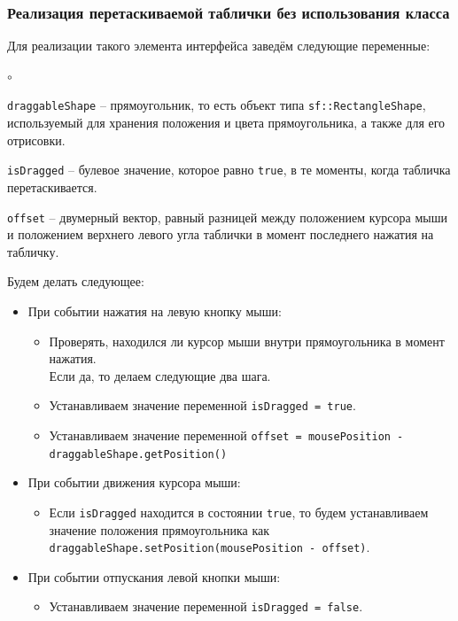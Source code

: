 \documentclass{article}
\begin{document}
\subsubsection*{Реализация перетаскиваемой таблички без использования класса}
 Для реализации такого элемента интерфейса заведём следующие переменные:
\begin{list}{$\circ$}{}  
\item \texttt{draggableShape} -- прямоугольник, то есть объект типа \texttt{sf::RectangleShape}, используемый для хранения положения и цвета прямоугольника, а также для его отрисовки.
\item \texttt{isDragged} -- булевое значение, которое равно \texttt{true}, в те моменты, когда табличка перетаскивается.
\item \texttt{offset} -- двумерный вектор, равный разницей между положением курсора мыши и положением верхнего левого угла таблички в момент последнего нажатия на табличку.
\end{list}
Будем делать следующее:
\begin{itemize}
\item При событии нажатия на левую кнопку мыши:
\begin{itemize}
\item Проверять, находился ли курсор мыши внутри прямоугольника в момент нажатия.\\
Если да, то делаем следующие два шага.
\item Устанавливаем значение переменной \texttt{isDragged = true}.
\item Устанавливаем значение переменной \texttt{offset = mousePosition - draggableShape.getPosition()}
\end{itemize}

\item При событии движения курсора мыши:
\begin{itemize}
\item Если \texttt{isDragged} находится в состоянии \texttt{true}, то будем устанавливаем значение положения прямоугольника как \texttt{draggableShape.setPosition(mousePosition - offset)}.
\end{itemize}

\item При событии отпускания левой кнопки мыши:
\begin{itemize}
\item Устанавливаем значение переменной \texttt{isDragged = false}.
\end{itemize}
\end{itemize}
\end{document}
